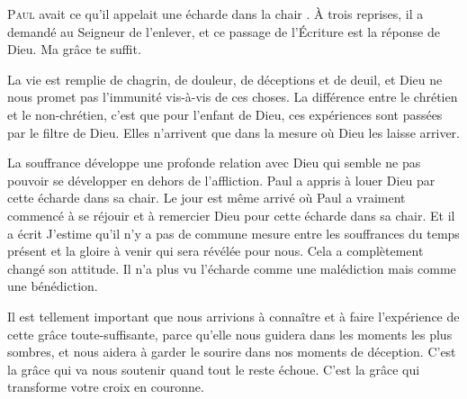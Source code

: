 \dvrule







\lettrine{P}{aul} avait ce qu'il appelait une \Og écharde dans la chair \Fg{}.
 À trois reprises, il a demandé au Seigneur de l'enlever,
 et ce passage de l'Écriture est la réponse de Dieu.
 \Og Ma grâce te suffit. \Fg{}

La vie est remplie de chagrin, de douleur, de déceptions et de deuil,
 et Dieu ne nous promet pas l'immunité vis-à-vis de ces choses.
 La différence entre le chrétien et le non-chrétien,
 c'est que pour l'enfant de Dieu, ces expériences sont passées
 par le filtre de Dieu. Elles n'arrivent que dans la mesure
 où Dieu les laisse arriver.


La souffrance développe une profonde relation avec Dieu qui semble
 ne pas pouvoir se développer en dehors de l'affliction.
 Paul a appris à louer Dieu par cette écharde dans sa chair.
 Le jour est même arrivé où Paul a vraiment commencé à se réjouir
 et à remercier Dieu pour cette écharde dans sa chair.
 Et il a écrit\frcolon{} 
 \Og J'estime qu'il n'y a pas de commune mesure entre les souffrances
 du temps présent et la gloire à venir qui sera révélée pour nous. \Fg{}
 Cela a complètement changé son attitude. Il n'a plus vu l'écharde
 comme une malédiction mais comme une bénédiction.

Il est tellement important que nous arrivions à connaître
 et à faire l'expérience de cette grâce toute-suffisante,
 parce qu'elle nous guidera dans les moments les plus sombres,
 et nous aidera à garder le sourire dans nos moments de déception.
 C'est la grâce qui va nous soutenir quand tout le reste échoue.
 C'est la grâce qui transforme votre croix en couronne.

